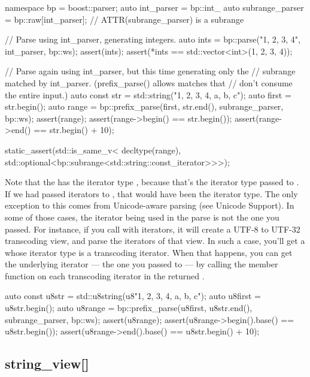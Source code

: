 \documentclass{MyBook}
\begin{document}
\begin{code}
namespace bp = boost::parser;
auto int_parser = bp::int_ %
auto subrange_parser = bp::raw[int_parser];  // ATTR(subrange_parser) is a subrange

// Parse using int_parser, generating integers.
auto ints = bp::parse("1, 2, 3, 4", int_parser, bp::ws);
assert(ints);
assert(*ints == std::vector<int>({1, 2, 3, 4}));

// Parse again using int_parser, but this time generating only the
// subrange matched by int_parser.  (prefix_parse() allows matches that
// don't consume the entire input.)
auto const str = std::string("1, 2, 3, 4, a, b, c");
auto first = str.begin();
auto range = bp::prefix_parse(first, str.end(), subrange_parser, bp::ws);
assert(range);
assert(range->begin() == str.begin());
assert(range->end() == str.begin() + 10);

static_assert(std::is_same_v<
              decltype(range),
              std::optional<bp::subrange<std::string::const_iterator>>>);
\end{code}

Note that the  has the iterator type , because that's the iterator type passed to . If we had passed  iterators to , that would have been the iterator type. The only exception to this comes from Unicode-aware parsing (see Unicode Support). In some of those cases, the iterator being used in the parse is not the one you passed. For instance, if you call  with  iterators, it will create a UTF-8 to UTF-32 transcoding view, and parse the iterators of that view. In such a case, you'll get a  whose iterator type is a transcoding iterator. When that happens, you can get the underlying iterator --- the one you passed to  --- by calling the  member function on each transcoding iterator in the returned .

\begin{code}
auto const u8str = std::u8string(u8"1, 2, 3, 4, a, b, c");
auto u8first = u8str.begin();
auto u8range = bp::prefix_parse(u8first, u8str.end(), subrange_parser, bp::ws);
assert(u8range);
assert(u8range->begin().base() == u8str.begin());
assert(u8range->end().base() == u8str.begin() + 10);
\end{code}

\subsection{string\_view{[}{]}}
\end{document}
